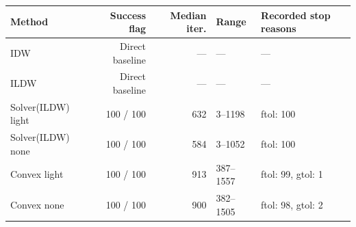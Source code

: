 \begin{tabular}{lrrlp{5.0cm}}\toprule
Method & Success flag & Median iter. & Range & Recorded stop reasons \\ \midrule
IDW & Direct baseline & --- & --- & --- \\
ILDW & Direct baseline & --- & --- & --- \\
Solver(ILDW) light & 100 / 100 & 632 & 3--1198 & ftol: 100 \\
Solver(ILDW) none & 100 / 100 & 584 & 3--1052 & ftol: 100 \\
Convex light & 100 / 100 & 913 & 387--1557 & ftol: 99, gtol: 1 \\
Convex none & 100 / 100 & 900 & 382--1505 & ftol: 98, gtol: 2 \\
\bottomrule\end{tabular}
